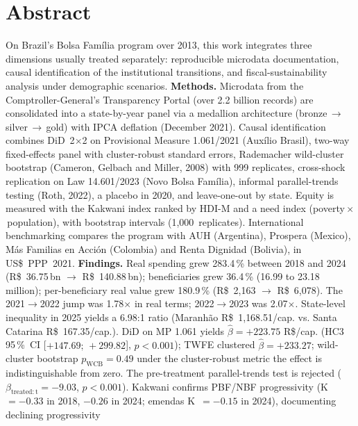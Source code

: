 \documentclass[12pt,a4paper,oneside]{article}
\begin{document}
\section*{Abstract}
\begin{singlespace}\small\noindent
On Brazil's Bolsa Família program over 2013, this
work integrates three dimensions usually treated separately:
reproducible microdata documentation, causal identification of the
institutional transitions, and fiscal-sustainability analysis under
demographic scenarios. \textbf{Methods.} Microdata from the
Comptroller-General's Transparency Portal (over 2.2 billion records)
are consolidated into a state-by-year panel via a medallion
architecture (bronze\,$\rightarrow$\,silver\,$\rightarrow$\,gold)
with IPCA deflation (December 2021). Causal identification combines
DiD~2$\times$2 on Provisional Measure 1.061/2021 (Auxílio Brasil),
two-way fixed-effects panel with cluster-robust standard errors,
Rademacher wild-cluster bootstrap (Cameron, Gelbach and Miller, 2008)
with 999 replicates, cross-shock replication on Law 14.601/2023
(Novo Bolsa Família), informal parallel-trends testing (Roth, 2022),
a placebo in 2020, and leave-one-out by state. Equity is measured
with the Kakwani index ranked by HDI-M and a need index
(poverty\,$\times$\,population), with bootstrap intervals
(1{,}000~replicates). International benchmarking compares the
program with AUH (Argentina), Prospera (Mexico), Más Familias en
Acción (Colombia) and Renta Dignidad (Bolivia), in US\$~PPP~2021.
\textbf{Findings.} Real spending grew 283.4\,\% between 2018 and
2024 (R\$~36.75\,bn $\rightarrow$ R\$~140.88\,bn);
beneficiaries grew 36.4\,\% (16.99 to 23.18\,million); per-beneficiary
real value grew 180.9\,\% (R\$~2{,}163 $\rightarrow$ R\$~6{,}078).
The 2021$\to$2022 jump was 1.78$\times$ in real terms; 2022$\to$2023
was 2.07$\times$. State-level inequality in 2025 yields a 6.98:1
ratio (Maranhão R\$~1{,}168.51/cap. vs. Santa Catarina
R\$~167.35/cap.). DiD on MP 1.061 yields
$\hat\beta = +223.75$ R\$/cap. (HC3 95\,\%~CI [$+147.69;\,+299.82$],
$p < 0.001$); TWFE clustered $\hat\beta = +233.27$;
wild-cluster bootstrap $p_{\mathrm{WCB}} = 0.49$ \textemdash{} under
the cluster-robust metric the effect is indistinguishable from
zero. The pre-treatment parallel-trends test is rejected
($\beta_{\mathrm{treated:t}} = -9.03$, $p < 0.001$). Kakwani
confirms PBF/NBF progressivity (K~$=-0.33$ in 2018, $-0.26$ in 2024;
emendas K~$=-0.15$ in 2024), documenting declining progressivity

\end{singlespace}
\end{document}
